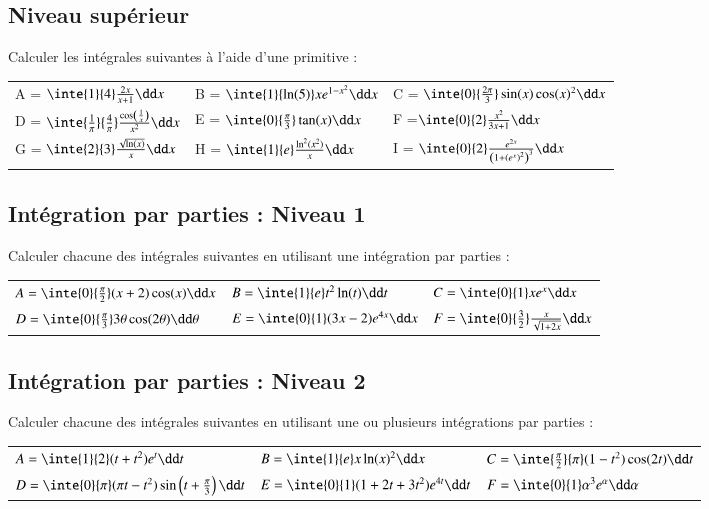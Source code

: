 \documentclass[oneside,12pt]{article}          %
\begin{document}
\subsection{Niveau supérieur}
Calculer les intégrales suivantes à l'aide d'une primitive :\\
\renewcommand{\arraystretch}{1.5}
\begin{tabular}{p{} p{} p{}}
    A = $\inte{1}{4}\frac{2x}{x+1}\dd x$ & B =  $\inte{1}{\ln(5)}xe^{1-x^2}\dd x$  & C = $\inte{0}{\frac{2\pi}{3}}\sin(x)\cos(x)^2\dd x$ \\
    D = $\inte{\frac{1}{\pi}}{\frac{4}{\pi}}\frac{\cos\left(\frac{1}{x}\right)}{x^2}\dd x$ & E = $\inte{0}{\frac{\pi}{3}}\tan(x)\dd x$ & F =$\inte{0}{2}\frac{x^2}{3x+1}\dd x$\\
    G = $\inte{2}{3}\frac{\sqrt{\ln(x)}}{x}\dd x$ & H = $\inte{1}{e}\frac{\ln^2(x^2)}{x}\dd x$ & I = $\inte{0}{2}\frac{e^{2x}}{\left(1+\left(e^x\right)^2\right)^3}\dd x$
\end{tabular}



\subsection{Intégration par parties : Niveau 1}
Calculer chacune des intégrales suivantes en utilisant une intégration par parties :

\begin{tabular}{p{} p{} p{}}
	$A=\inte{0}{\frac{\pi}{2}}(x+2)\cos(x)\dd x$ & $B=\inte{1}{e}t^2\ln(t)\dd t$ & $C=\inte{0}{1}xe^x\dd x$ \\[5pt]
	$D=\inte{0}{\frac{\pi}{3}}3\theta\cos(2\theta)\dd \theta$ & $E=\inte{0}{1}(3x-2)e^{4x}\dd x$ & $F=\inte{0}{\frac{3}{2}}\frac{x}{\sqrt{1+2x}}\dd x$
\end{tabular}



\subsection{Intégration par parties : Niveau 2}
Calculer chacune des intégrales suivantes en utilisant une ou plusieurs intégrations par parties :

\begin{tabular}{p{} p{} p{}}
	$A=\inte{1}{2}(t+t^2)e^t\dd t$ & $B=\inte{1}{e}x\ln(x)^2\dd x$ & $C=\inte{\frac{\pi}{2}}{\pi}(1-t^2)\cos(2t)\dd t$ \\[5pt]
	$D=\inte{0}{\pi}(\pi t-t^2)\sin\left(t+\frac{\pi}{3}\right)\dd t$ & $E=\inte{0}{1}(1+2t+3t^2)e^{4t}\dd t$ & $F=\inte{0}{1}\alpha^3e^\alpha\dd \alpha$
\end{tabular}
\end{document}
